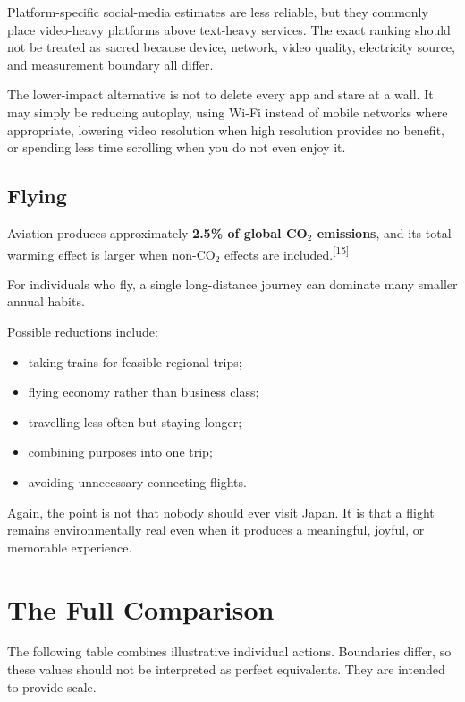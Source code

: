 \documentclass{article}
\begin{document}
Platform-specific social-media estimates are less reliable, but they commonly place video-heavy platforms above text-heavy services. The exact ranking should not be treated as sacred because device, network, video quality, electricity source, and measurement boundary all differ.

The lower-impact alternative is not to delete every app and stare at a wall. It may simply be reducing autoplay, using Wi-Fi instead of mobile networks where appropriate, lowering video resolution when high resolution provides no benefit, or spending less time scrolling when you do not even enjoy it.

\subsection*{Flying}

Aviation produces approximately \textbf{2.5\% of global CO$_2$ emissions}, and its total warming effect is larger when non-CO$_2$ effects are included.\textsuperscript{[15]}

For individuals who fly, a single long-distance journey can dominate many smaller annual habits.

Possible reductions include:

\begin{itemize}[noitemsep]
    \item taking trains for feasible regional trips;
    \item flying economy rather than business class;
    \item travelling less often but staying longer;
    \item combining purposes into one trip;
    \item avoiding unnecessary connecting flights.
\end{itemize}

Again, the point is not that nobody should ever visit Japan. It is that a flight remains environmentally real even when it produces a meaningful, joyful, or memorable experience.

\section*{The Full Comparison}

The following table combines illustrative individual actions. Boundaries differ, so these values should not be interpreted as perfect equivalents. They are intended to provide scale.
\end{document}
